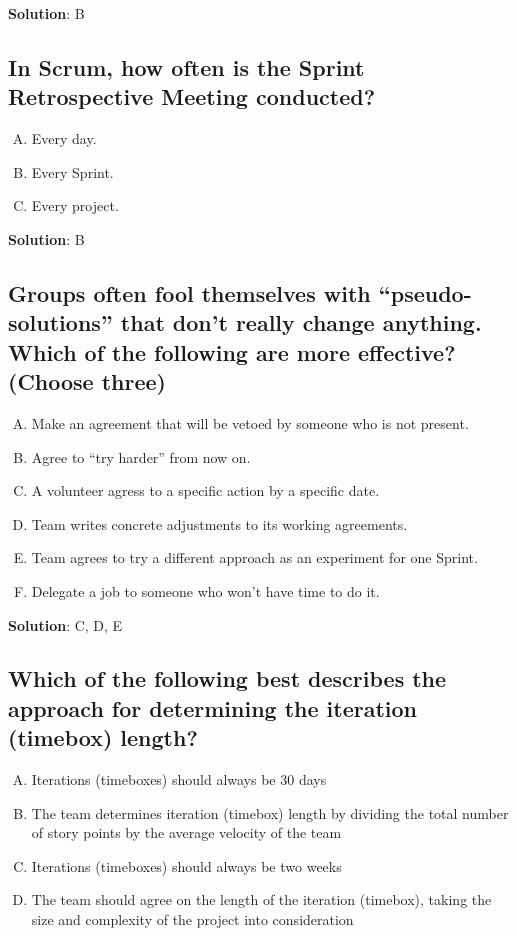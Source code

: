 \textbf{Solution}: B


\subsection{In Scrum, how often is the Sprint Retrospective Meeting conducted?}
\begin{enumerate}[A)]
  \item Every day.
  \item Every Sprint.
  \item Every project.
\end{enumerate}


\textbf{Solution}: B


\subsection{Groups often fool themselves with \enquote{pseudo-solutions} that don't really change
  anything. Which of the following are more effective? (Choose three)}
\begin{enumerate}[A)]
  \item Make an agreement that will be vetoed by someone who is not present.
  \item Agree to \enquote{try harder} from now on.
  \item A volunteer agress to a specific action by a specific date.
  \item Team writes concrete adjustments to its working agreements.
  \item Team agrees to try a different approach as an experiment for one Sprint.
  \item Delegate a job to someone who won't have time to do it.
\end{enumerate}


\textbf{Solution}: C, D, E


\subsection{Which of the following best describes the approach for determining the iteration (timebox) length?}
\begin{enumerate}[A)]
  \item Iterations (timeboxes) should always be 30 days
  \item The team determines iteration (timebox) length by dividing the total number of story points by the average velocity of the team
  \item Iterations (timeboxes) should always be two weeks
  \item The team should agree on the length of the iteration (timebox), taking the size and complexity of the project into consideration
\end{enumerate}


